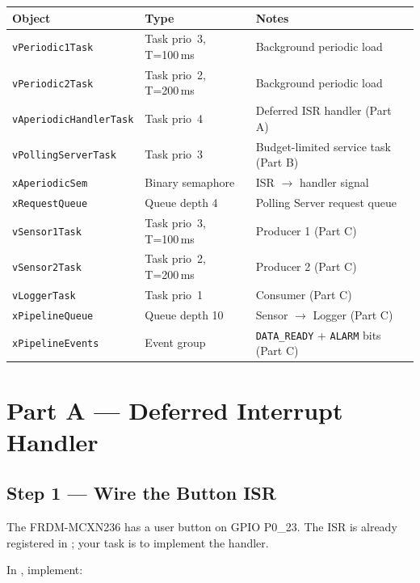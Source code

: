 \documentclass[11pt, a4paper]{article}
\begin{document}
\renewcommand{\arraystretch}{1.25}
\begin{tabular}{@{} p{4.5cm} p{3.5cm} p{5.5cm} @{}}
  \toprule
  \textbf{Object} & \textbf{Type} & \textbf{Notes} \\
  \midrule
  \texttt{vPeriodic1Task}        & Task prio~3, T=100\,ms & Background periodic load \\
  \texttt{vPeriodic2Task}        & Task prio~2, T=200\,ms & Background periodic load \\
  \texttt{vAperiodicHandlerTask} & Task prio~4             & Deferred ISR handler (Part A) \\
  \texttt{vPollingServerTask}    & Task prio~3             & Budget-limited service task (Part B) \\
  \texttt{xAperiodicSem}         & Binary semaphore        & ISR $\to$ handler signal \\
  \texttt{xRequestQueue}         & Queue depth 4           & Polling Server request queue \\
  \texttt{vSensor1Task}          & Task prio~3, T=100\,ms & Producer 1 (Part C) \\
  \texttt{vSensor2Task}          & Task prio~2, T=200\,ms & Producer 2 (Part C) \\
  \texttt{vLoggerTask}           & Task prio~1             & Consumer (Part C) \\
  \texttt{xPipelineQueue}        & Queue depth 10          & Sensor $\to$ Logger (Part C) \\
  \texttt{xPipelineEvents}       & Event group             & \texttt{DATA\_READY} + \texttt{ALARM} bits (Part C) \\
  \bottomrule
\end{tabular}
\renewcommand{\arraystretch}{1}

\section{Part A --- Deferred Interrupt Handler}

\subsection{Step 1 --- Wire the Button ISR}

The FRDM-MCXN236 has a user button on GPIO P0\_23. The ISR is already registered in
; your task is to implement the handler.

In , implement:
\end{document}

